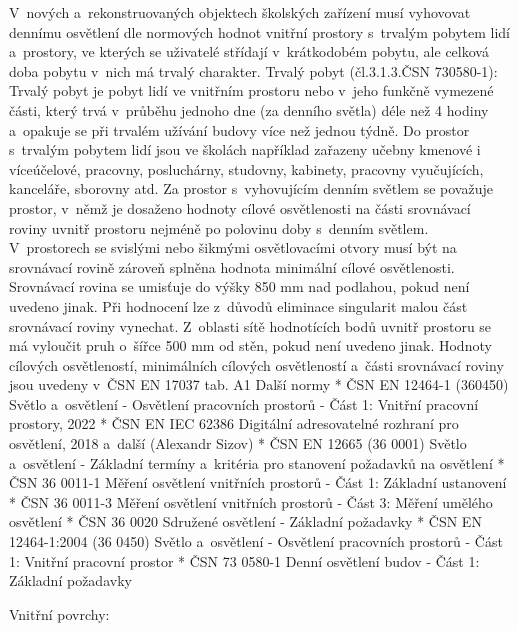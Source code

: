 V~nových a~rekonstruovaných objektech školských zařízení musí vyhovovat dennímu osvětlení dle normových
hodnot vnitřní prostory s~trvalým pobytem lidí a~prostory, ve kterých se uživatelé střídají v~krátkodobém pobytu,
ale celková doba pobytu v~nich má trvalý charakter.
Trvalý pobyt (čl.3.1.3.ČSN 730580-1):
\medskip
Trvalý pobyt je pobyt lidí ve vnitřním prostoru nebo v~jeho funkčně vymezené části, který trvá v~průběhu jednoho
dne (za denního světla) déle než 4 hodiny a~opakuje se při trvalém užívání budovy více než jednou týdně.
\medskip
Do prostor s~trvalým pobytem lidí jsou ve školách například zařazeny učebny kmenové i víceúčelové, pracovny,
posluchárny, studovny, kabinety, pracovny vyučujících, kanceláře, sborovny atd. Za prostor s~vyhovujícím
denním světlem se považuje prostor, v~němž je dosaženo hodnoty cílové osvětlenosti na části srovnávací
roviny uvnitř prostoru nejméně po polovinu doby s~denním světlem.
\medskip
V~prostorech se svislými nebo šikmými osvětlovacími otvory musí být na srovnávací rovině zároveň splněna
hodnota minimální cílové osvětlenosti.
\medskip
Srovnávací rovina se umisťuje do výšky 850 mm nad podlahou, pokud není uvedeno jinak. Při hodnocení lze z~důvodů
eliminace singularit malou část srovnávací roviny vynechat. Z~oblasti sítě hodnotících bodů uvnitř prostoru se
má vyloučit pruh o~šířce 500 mm od stěn, pokud není uvedeno jinak.
\medskip
Hodnoty cílových osvětleností, minimálních cílových osvětleností a~části srovnávací roviny jsou uvedeny v~ČSN EN 17037 tab. A1
\medskip
{\sbf Další normy}
\begitems
    * ČSN EN 12464-1 (360450) Světlo a~osvětlení - Osvětlení pracovních prostorů - Část 1: Vnitřní pracovní prostory, 2022
    * ČSN EN IEC 62386 Digitální adresovatelné rozhraní pro osvětlení, 2018
      a~další (Alexandr Sizov)
    * ČSN EN 12665 (36 0001) Světlo a~osvětlení - Základní termíny a~kritéria pro stanovení požadavků na osvětlení
    * ČSN 36 0011-1 Měření osvětlení vnitřních prostorů - Část 1: Základní ustanovení
    * ČSN 36 0011-3 Měření osvětlení vnitřních prostorů - Část 3: Měření umělého osvětlení
    * ČSN 36 0020 Sdružené osvětlení - Základní požadavky
    * ČSN EN 12464-1:2004 (36 0450) Světlo a~osvětlení - Osvětlení pracovních prostorů - Část 1: Vnitřní pracovní prostor
    * ČSN 73 0580-1 Denní osvětlení budov - Část 1: Základní požadavky
\enditems

{\sbf Vnitřní povrchy:}

